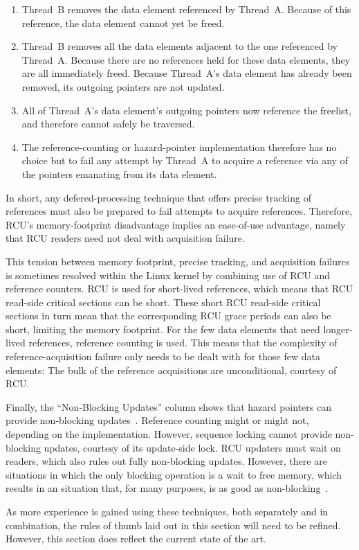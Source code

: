 \begin{enumerate}
\item	Thread~B removes the data element referenced by Thread~A.
	Because of this reference, the data element cannot yet be freed.
\item	Thread~B removes all the data elements adjacent to the one
	referenced by Thread~A.
	Because there are no references held for these data elements,
	they are all immediately freed.
	Because Thread~A's data element has already been removed,
	its outgoing pointers are not updated.
\item	All of Thread~A's data element's outgoing pointers now reference
	the freelist, and therefore cannot safely be traversed.
\item	The reference-counting or hazard-pointer implementation therefore
	has no choice but to fail any attempt by Thread~A to acquire
	a reference via any of the pointers emanating from its data
	element.
\end{enumerate}

In short, any defered-processing technique that offers precise tracking
of references must also be prepared to fail attempts to acquire references.
Therefore, RCU's memory-footprint disadvantage implies an ease-of-use
advantage, namely that RCU readers need not deal with acquisition failure.

This tension between memory footprint, precise tracking, and acquisition
failures is sometimes resolved within the Linux kernel by combining use
of RCU and reference counters.
RCU is used for short-lived references, which means that RCU read-side
critical sections can be short.
These short RCU read-side critical sections in turn mean that the corresponding
RCU grace periods can also be short, limiting the memory footprint.
For the few data elements that need longer-lived references, reference
counting is used.
This means that the complexity of reference-acquisition failure only
needs to be dealt with for those few data elements:  The bulk of
the reference acquisitions are unconditional, courtesy of RCU.

Finally, the ``Non-Blocking Updates'' column shows that hazard pointers
can provide non-blocking updates~\cite{MagedMichael04a,HerlihyLM02}.
Reference counting might or might not, depending on the implementation.
However, sequence locking cannot provide non-blocking updates, courtesy
of its update-side lock.
RCU updaters must wait on readers, which also rules out fully non-blocking
updates.
However, there are situations in which the only blocking operation is
a wait to free memory, which results in an situation that, for many
purposes, is as good as non-blocking~\cite{MathieuDesnoyers2012URCU}.

As more experience is gained using these techniques, both separately
and in combination, the rules of thumb laid out in this section will
need to be refined.
However, this section does reflect the current state of the art.

